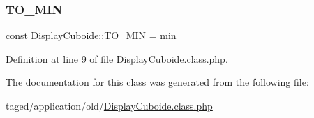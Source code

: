 \subsubsection{\texorpdfstring{T\+O\+\_\+\+M\+IN}{TO\_MIN}}
{\footnotesize\ttfamily const Display\+Cuboide\+::\+T\+O\+\_\+\+M\+IN = \textquotesingle{}min\textquotesingle{}}



Definition at line 9 of file Display\+Cuboide.\+class.\+php.



The documentation for this class was generated from the following file\+:\begin{DoxyCompactItemize}
\item 
taged/application/old/\hyperlink{_display_cuboide_8class_8php}{Display\+Cuboide.\+class.\+php}\end{DoxyCompactItemize}
